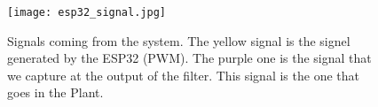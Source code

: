 \begin{figure}[h!]
    \centering
    \texttt{[image: esp32\_signal.jpg]}
    \caption{Signals coming from the system. The yellow signal is the signel generated by the ESP32 (PWM). The purple one is the signal that we capture at the output of the filter. This signal is the one that goes in the Plant.} 
    \vspace{0.1cm}
    \label{fig:esp_32_signal}
\end{figure}










